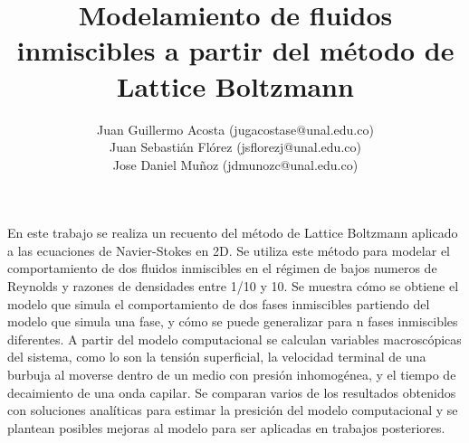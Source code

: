 \documentclass[svgnames,11pt]{article}
\title{Modelamiento de fluidos inmiscibles a partir del m\'etodo de Lattice Boltzmann}
\date{}
\author{ \small{Juan Guillermo Acosta (jugacostase@unal.edu.co)}\\
\small{Juan Sebasti\'an Fl\'orez (jsflorezj@unal.edu.co)}\\
\small{Jose Daniel Muñoz (jdmunozc@unal.edu.co)}}
\begin{document}
\maketitle


\noindent En este trabajo se realiza un recuento del m\'etodo de Lattice Boltzmann aplicado a las ecuaciones de Navier-Stokes en 2D. Se utiliza este m\'etodo para modelar el comportamiento de dos fluidos inmiscibles en el r\'egimen de bajos numeros de Reynolds y razones de densidades entre 1/10 y 10. Se muestra c\'omo se obtiene el modelo que simula el comportamiento de dos fases inmiscibles partiendo del modelo que simula una fase, y c\'omo se puede generalizar para n fases inmiscibles diferentes. A partir del modelo computacional se calculan variables macrosc\'opicas del sistema, como lo son la tensi\'on superficial, la velocidad terminal de una burbuja al moverse dentro de un medio con presi\'on inhomog\'enea, y el tiempo de decaimiento de una onda capilar. Se comparan varios de los resultados obtenidos con soluciones anal\'iticas para estimar la presici\'on del modelo computacional y se plantean posibles mejoras al modelo para ser aplicadas en trabajos posteriores.\\ 
\end{document}
